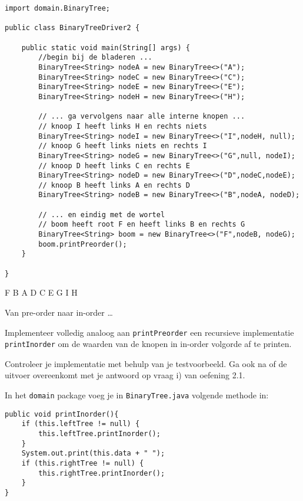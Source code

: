 \begin{oef}
\begin{opl}
\begin{oefenumerate}
\begin{lstlisting}[caption={Binaire boom uit oefening 1}, label=binoef1]
import domain.BinaryTree;

public class BinaryTreeDriver2 {

	public static void main(String[] args) {
		//begin bij de bladeren ...
		BinaryTree<String> nodeA = new BinaryTree<>("A");
		BinaryTree<String> nodeC = new BinaryTree<>("C");
		BinaryTree<String> nodeE = new BinaryTree<>("E");
		BinaryTree<String> nodeH = new BinaryTree<>("H");

		// ... ga vervolgens naar alle interne knopen ...
		// knoop I heeft links H en rechts niets
		BinaryTree<String> nodeI = new BinaryTree<>("I",nodeH, null);
		// knoop G heeft links niets en rechts I
		BinaryTree<String> nodeG = new BinaryTree<>("G",null, nodeI);
		// knoop D heeft links C en rechts E
		BinaryTree<String> nodeD = new BinaryTree<>("D",nodeC,nodeE);
		// knoop B heeft links A en rechts D
		BinaryTree<String> nodeB = new BinaryTree<>("B",nodeA, nodeD);
		
		// ... en eindig met de wortel
		// boom heeft root F en heeft links B en rechts G
		BinaryTree<String> boom = new BinaryTree<>("F",nodeB, nodeG);
		boom.printPreorder();
	}

}
 \end{lstlisting}
 
 \item F B A D C E G I H 
\end{oefenumerate}

\end{opl}
\end{oef}




\begin{oef}
\code Van pre-order naar in-order …
\begin{oefenumerate}
	\item Implementeer volledig analoog aan \verb=printPreorder= een recursieve implementatie \verb=printInorder= om de waarden van de knopen in in-order volgorde af te printen.
	\item Controleer je implementatie met behulp van je testvoorbeeld. Ga ook na of de uitvoer overeenkomt met je antwoord op vraag i) van oefening 2.1.
\end{oefenumerate}
\begin{opl}
In het \verb+domain+ package voeg je in \verb+BinaryTree.java+ volgende methode in:
\begin{lstlisting}[caption={In-order doorloop van een binaire boom}, label=bininorder]
public void printInorder(){
	if (this.leftTree != null) {
		this.leftTree.printInorder();
	}
	System.out.print(this.data + " ");
	if (this.rightTree != null) {
		this.rightTree.printInorder();
	}
}
\end{lstlisting}

\end{opl}
\end{oef}


